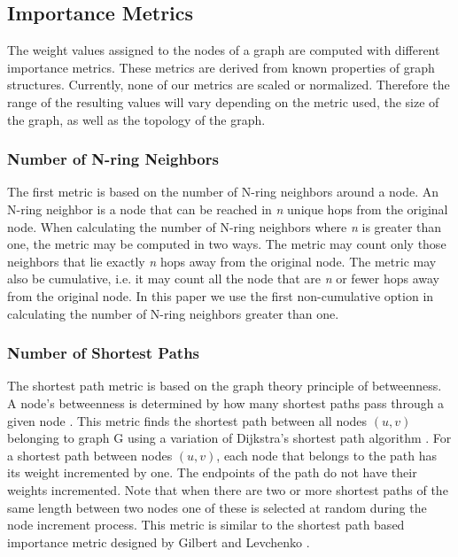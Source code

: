 \subsection{Importance Metrics}
The weight values assigned to the nodes of a graph are computed with different importance metrics.  These metrics are derived from known properties of graph structures.  Currently, none of our metrics are scaled or normalized.  Therefore the range of the resulting values  will vary depending on the metric used, the size of the graph, as well as the topology of the graph.

\subsubsection{Number of N-ring Neighbors}
The first metric is based on the number of N-ring neighbors around a node.  An N-ring neighbor is a node that can be reached in {\em n} unique hops from the original node. When calculating the number of N-ring neighbors where {\em n} is greater than one, the metric may be computed  in two ways.  The metric may count only those neighbors that lie exactly {\em n} hops away from the original node.  The metric may also be cumulative, i.e. it may count all the node that are {\em n} or fewer hops away from the original node.  In this paper we use the first non-cumulative option in calculating the number of N-ring neighbors greater than one.

\subsubsection{Number of Shortest Paths}
The shortest path metric is based on the graph theory principle of betweenness.  A node's betweenness is determined by  how many shortest paths pass through a given node \cite{Wei07}.  This metric finds the shortest path between all nodes $(u,v)$ belonging to graph G using a variation of Dijkstra's shortest path algorithm \cite{Har69}.  For a shortest path between nodes $(u,v)$, each node that belongs to the path has its weight incremented by one. The endpoints of the path do not have their weights incremented. Note that when there are two or more shortest paths of the same length between two nodes one of these is selected at random during the node increment process.
This metric is similar to the shortest path based importance metric designed by Gilbert and Levchenko \cite{Gilbert-Levchenko04}.

